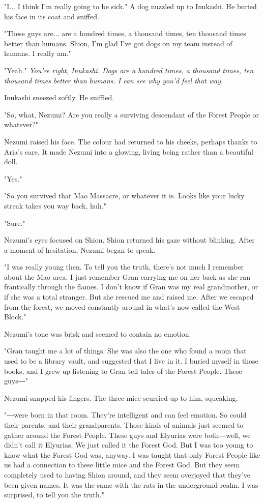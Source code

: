 "I... I think I'm really going to be sick." A dog nuzzled up to
Inukashi. He buried his face in its coat and sniffed.

"These guys are... are a hundred times, a thousand times, ten thousand
times better than humans. Shion, I'm glad I've got dogs on my team
instead of humans. I really am."

"Yeah." \emph{You're right, Inukashi. Dogs are a hundred times, a thousand
times, ten thousand times better than humans. I can see why you'd feel
that way.}

Inukashi sneezed softly. He sniffled.

"So, what, Nezumi? Are you really a surviving descendant of the Forest
People or whatever?"

Nezumi raised his face. The colour had returned to his cheeks, perhaps
thanks to Aria's care. It made Nezumi into a glowing, living being
rather than a beautiful doll.

"Yes."

"So you survived that Mao Massacre, or whatever it is. Looks like your
lucky streak takes you way back, huh."

"Sure."

Nezumi's eyes focused on Shion. Shion returned his gaze without
blinking. After a moment of hesitation, Nezumi began to speak.

"I was really young then. To tell you the truth, there's not much I
remember about the Mao area. I just remember Gran carrying me on her
back as she ran frantically through the flames. I don't know if Gran was
my real grandmother, or if she was a total stranger. But she rescued me
and raised me. After we escaped from the forest, we moved constantly
around in what's now called the West Block."

Nezumi's tone was brisk and seemed to contain no emotion.

"Gran taught me a lot of things. She was also the one who found a room
that used to be a library vault, and suggested that I live in it. I
buried myself in those books, and I grew up listening to Gran tell tales
of the Forest People. These guys―"

Nezumi snapped his fingers. The three mice scurried up to him,
squeaking.

"―were born in that room. They're intelligent and can feel emotion. So
could their parents, and their grandparents. Those kinds of animals just
seemed to gather around the Forest People. These guys and Elyurias were
both―well, we didn't call it Elyurias. We just called it the Forest God.
But I was too young to know what the Forest God was, anyway. I was
taught that only Forest People like us had a connection to these little
mice and the Forest God. But they seem completely used to having Shion
around, and they seem overjoyed that they've been given names. It was
the same with the rats in the underground realm. I was surprised, to
tell you the truth."

